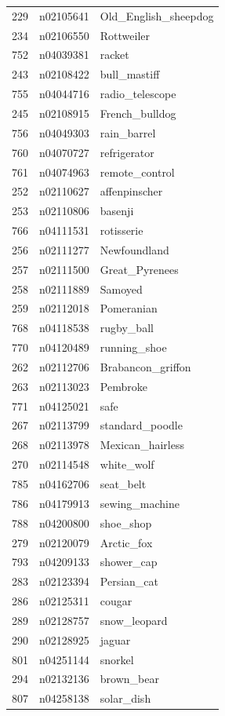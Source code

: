 \begin{table}
\begin{tabular}{cll}
229 & n02105641 & Old_English_sheepdog \\
234 & n02106550 & Rottweiler \\
752 & n04039381 & racket \\
243 & n02108422 & bull_mastiff \\
755 & n04044716 & radio_telescope \\
245 & n02108915 & French_bulldog \\
756 & n04049303 & rain_barrel \\
760 & n04070727 & refrigerator \\
761 & n04074963 & remote_control \\
252 & n02110627 & affenpinscher \\
253 & n02110806 & basenji \\
766 & n04111531 & rotisserie \\
256 & n02111277 & Newfoundland \\
257 & n02111500 & Great_Pyrenees \\
258 & n02111889 & Samoyed \\
259 & n02112018 & Pomeranian \\
768 & n04118538 & rugby_ball \\
770 & n04120489 & running_shoe \\
262 & n02112706 & Brabancon_griffon \\
263 & n02113023 & Pembroke \\
771 & n04125021 & safe \\
267 & n02113799 & standard_poodle \\
268 & n02113978 & Mexican_hairless \\
270 & n02114548 & white_wolf \\
785 & n04162706 & seat_belt \\
786 & n04179913 & sewing_machine \\
788 & n04200800 & shoe_shop \\
279 & n02120079 & Arctic_fox \\
793 & n04209133 & shower_cap \\
283 & n02123394 & Persian_cat \\
286 & n02125311 & cougar \\
289 & n02128757 & snow_leopard \\
290 & n02128925 & jaguar \\
801 & n04251144 & snorkel \\
294 & n02132136 & brown_bear \\
807 & n04258138 & solar_dish \\

\end{tabular}
\end{table}
